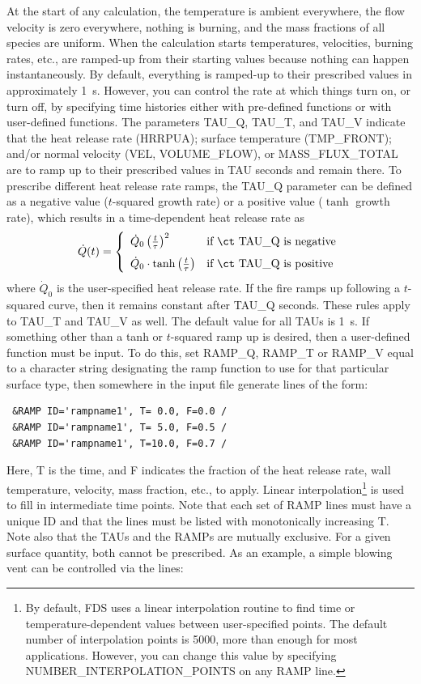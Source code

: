 \documentclass[11pt]{book}
\begin{document}
At the start of any calculation, the temperature is ambient everywhere, the flow velocity is zero everywhere, nothing is burning, and the mass fractions of all species are uniform.  When the calculation starts temperatures, velocities, burning rates, etc., are ramped-up from their starting values because nothing can happen instantaneously. By default, everything is ramped-up to their prescribed values in approximately 1~s. However, you can control the rate at which things turn on, or turn off, by specifying time histories either with pre-defined functions or with user-defined functions.  The parameters {\ct TAU\_Q}, {\ct TAU\_T}, and {\ct TAU\_V} indicate that the heat release rate ({\ct HRRPUA}); surface temperature ({\ct TMP\_FRONT}); and/or normal velocity ({\ct VEL}, {\ct VOLUME\_FLOW}), or {\ct MASS\_FLUX\_TOTAL} are to ramp up to their prescribed values in {\ct TAU} seconds and remain there. To prescribe different heat release rate ramps, the {\ct TAU\_Q} parameter can be defined as a negative value ($t$-squared growth rate) or a positive value ($\tanh$ growth rate), which results in a time-dependent heat release rate as
\begin{equation}
\dot Q(t) = \left\{ \begin{array}{ll} \dot Q_0 \left( \frac{t}{\tau} \right)^2            &  \mbox{if {\ct TAU\_Q} is negative} \\[.1in]
                                      \dot Q_0 \cdot \tanh \left( \frac{t}{\tau} \right)  &  \mbox{if {\ct TAU\_Q} is positive}  \end{array} \right.
\end{equation}
where $\dot Q_0$ is the user-specified heat release rate. If the fire ramps up following a $t$-squared curve, then it remains constant after {\ct TAU\_Q} seconds.  These rules apply to {\ct TAU\_T} and {\ct TAU\_V} as well. The default value for all {\ct TAU}s is 1~s.  If something other than a tanh or $t$-squared ramp up is desired, then a user-defined function must be input. To do this, set {\ct RAMP\_Q}, {\ct RAMP\_T} or {\ct RAMP\_V} equal to a character string designating the ramp function to use for that particular surface type, then somewhere in the input file generate lines of the form:
\begin{lstlisting}
 &RAMP ID='rampname1', T= 0.0, F=0.0 /
 &RAMP ID='rampname1', T= 5.0, F=0.5 /
 &RAMP ID='rampname1', T=10.0, F=0.7 /
\end{lstlisting}
Here, {\ct T} is the time, and {\ct F} indicates the fraction of the heat release rate, wall temperature, velocity, mass fraction, etc., to apply. Linear interpolation\footnote{By default, FDS uses a linear interpolation routine to find time or temperature-dependent values between user-specified points. The default number of interpolation points is 5000, more than enough for most applications. However, you can change this value by specifying {\ct NUMBER\_INTERPOLATION\_POINTS} on any {\ct RAMP} line.} is used to fill in intermediate time points. Note that each set of {\ct RAMP} lines must have a unique {\ct ID} and that the lines must be listed with monotonically increasing {\ct T}. Note also that the {\ct TAU}s and the {\ct RAMP}s are mutually exclusive. For a given surface quantity, both cannot be prescribed. As an example, a simple blowing vent can be controlled via the lines:
\end{document}

